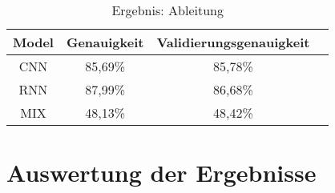     \begin{table}[H]
        \centering
        \begin{tabular}{|c|c|c|c|}
            \hline
            Model & Genauigkeit & Validierungsgenauigkeit \\
            \hline
            CNN & 85,69\% & 85,78\% \\
            \hline
            RNN & 87,99\% & 86,68\% \\
            \hline
            MIX & 48,13\% & 48,42\% \\
            \hline
        \end{tabular}
        \caption{Ergebnis: Ableitung}
        \label{tabl:ErgebnisAbleitung}
    \end{table}
        


\section{Auswertung der Ergebnisse}

